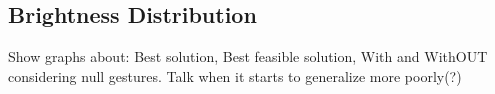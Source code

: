 \subsection{Brightness Distribution}
Show graphs about:
Best solution,
Best feasible solution,
With and WithOUT considering null gestures.
Talk when it starts to generalize more poorly(?)
